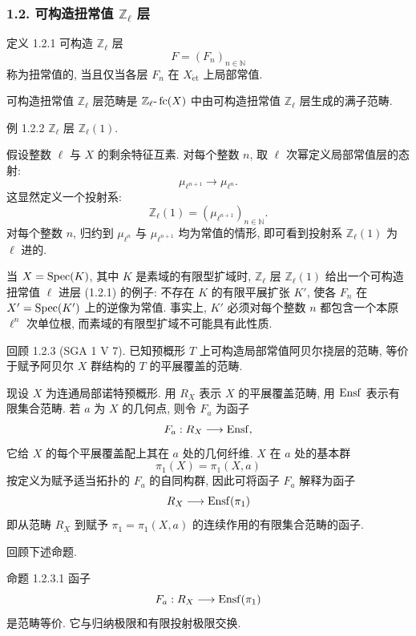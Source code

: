 \subsubsection*{1.2. 可构造扭常值 \(\mathbb Z_\ell\) 层}

\begin{statement}{定义 1.2.1}
可构造 \(\mathbb Z_\ell\) 层
\[
F=(F_n)_{n\in\mathbb N}
\]
称为扭常值的, 当且仅当各层 \(F_n\) 在 \(X_{\mathrm{\acute et}}\) 上局部常值.
\end{statement}

可构造扭常值 \(\mathbb Z_\ell\) 层范畴是 \(\mathbb Z_\ell\text{-}\operatorname{fc}(X)\) 中由可构造扭常值 \(\mathbb Z_\ell\) 层生成的满子范畴.

\begin{statement}{例 1.2.2}
\(\mathbb Z_\ell\) 层 \(\mathbb Z_\ell(1)\).
\end{statement}

假设整数 \(\ell\) 与 \(X\) 的剩余特征互素. 对每个整数 \(n\), 取 \(\ell\) 次幂定义局部常值层的态射:
\[
\mu_{\ell^{n+1}}\longrightarrow \mu_{\ell^n}.
\]
这显然定义一个投射系:
\[
\mathbb Z_\ell(1)=(\mu_{\ell^{n+1}})_{n\in\mathbb N}.
\]
对每个整数 \(n\), 归约到 \(\mu_{\ell^n}\) 与 \(\mu_{\ell^{n+1}}\) 均为常值的情形, 即可看到投射系 \(\mathbb Z_\ell(1)\) 为 \(\ell\) 进的.

当 \(X=\operatorname{Spec}(K)\), 其中 \(K\) 是素域的有限型扩域时, \(\mathbb Z_\ell\) 层 \(\mathbb Z_\ell(1)\) 给出一个可构造扭常值 \(\ell\) 进层 (1.2.1) 的例子: 不存在 \(K\) 的有限平展扩张 \(K'\), 使各 \(F_n\) 在 \(X'=\operatorname{Spec}(K')\) 上的逆像为常值. 事实上, \(K'\) 必须对每个整数 \(n\) 都包含一个本原 \(\ell^n\) 次单位根, 而素域的有限型扩域不可能具有此性质.

\begin{statement}{回顾 1.2.3}
(SGA 1 V 7). 已知预概形 \(T\) 上可构造局部常值阿贝尔挠层的范畴, 等价于赋予阿贝尔 \(X\) 群结构的 \(T\) 的平展覆盖的范畴.
\end{statement}

现设 \(X\) 为连通局部诺特预概形. 用 \(R_X\) 表示 \(X\) 的平展覆盖范畴, 用 \(\operatorname{Ensf}\) 表示有限集合范畴. 若 \(a\) 为 \(X\) 的几何点, 则令 \(F_a\) 为函子
\[
F_a:R_X\longrightarrow \operatorname{Ensf},
\]
它给 \(X\) 的每个平展覆盖配上其在 \(a\) 处的几何纤维. \(X\) 在 \(a\) 处的基本群
\[
\pi_1(X)=\pi_1(X,a)
\]
按定义为赋予适当拓扑的 \(F_a\) 的自同构群, 因此可将函子 \(F_a\) 解释为函子
\[
R_X\longrightarrow \operatorname{Ensf}(\pi_1)
\]
即从范畴 \(R_X\) 到赋予 \(\pi_1=\pi_1(X,a)\) 的连续作用的有限集合范畴的函子.

回顾下述命题.

\begin{statement}{命题 1.2.3.1}
函子
\[
F_a:R_X\longrightarrow \operatorname{Ensf}(\pi_1)
\]
是范畴等价. 它与归纳极限和有限投射极限交换.
\end{statement}

